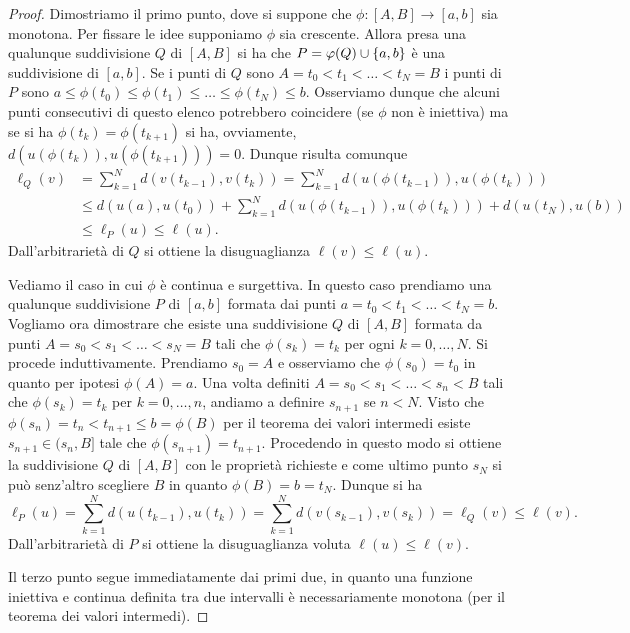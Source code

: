 \begin{proof}
Dimostriamo il primo punto, dove si suppone che $\phi:[A,B] \to [a,b]$ 
sia monotona. Per fissare le idee supponiamo $\phi$ sia crescente.
Allora presa una qualunque suddivisione $Q$ di $[A,B]$ si ha che 
$P=\varphi(Q)\cup {\left\{ a,b \right\}}$ è una suddivisione di $[a,b]$.
Se i punti di $Q$ sono $A = t_0 < t_1 < \dots < t_N = B$ i punti di 
$P$ sono $a \le \phi(t_0) \le \phi(t_1) \le \dots \le \phi(t_N) \le b$.
Osserviamo dunque che alcuni punti consecutivi di questo elenco 
potrebbero coincidere
(se $\phi$ non è iniettiva) ma se si ha $\phi(t_k) = \phi(t_{k+1})$
si ha, ovviamente, $d(u(\phi(t_k)), u(\phi(t_{k+1}))) = 0$. 
Dunque risulta comunque 
\begin{align*}
 \ell_Q(v) &= \sum_{k=1}^N d(v(t_{k-1}), v(t_k))
  = \sum_{k=1}^N d(u(\phi(t_{k-1})), u(\phi(t_k)))\\
  &\le d(u(a), u(t_0)) + \sum_{k=1}^N d(u(\phi(t_{k-1})), u(\phi(t_k))) + d(u(t_N), u(b))\\
  &\le \ell_P(u) \le \ell(u).
\end{align*}
Dall'arbitrarietà di $Q$ si ottiene la disuguaglianza $\ell(v) \le \ell(u)$.

Vediamo il caso in cui $\phi$ è continua e surgettiva. 
In questo caso prendiamo una qualunque suddivisione $P$ di $[a,b]$ 
formata dai punti $a = t_0 < t_1 < \dots < t_N = b$.
Vogliamo ora dimostrare che esiste una suddivisione $Q$ di $[A,B]$
formata da punti $A = s_0 < s_1 < \dots < s_N = B$ tali 
che $\phi(s_k) = t_k$ per ogni $k=0,\dots,N$. 
Si procede induttivamente. Prendiamo $s_0=A$ e osserviamo che $\phi(s_0) = t_0$
in quanto per ipotesi $\phi(A) = a$.
Una volta definiti $A = s_0 < s_1 < \dots < s_n < B$ tali che $\phi(s_k) = t_k$ per $k=0,\dots,n$,
andiamo a definire $s_{n+1}$ se $n < N$.
Visto che $\phi(s_n) = t_n < t_{n+1} \le b = \phi(B)$ 
per il teorema dei valori intermedi esiste $s_{n+1} \in (s_n, B]$ tale che
$\phi(s_{n+1}) = t_{n+1}$. 
Procedendo in questo modo si ottiene la suddivisione $Q$ di $[A,B]$ 
con le proprietà richieste e come ultimo punto $s_N$ si può senz'altro scegliere $B$ 
in quanto $\phi(B) = b = t_N$.
Dunque si ha 
\[
  \ell_P(u) = \sum_{k=1}^N d(u(t_{k-1}), u(t_k))
  = \sum_{k=1}^N d(v(s_{k-1}), v(s_k)) = \ell_Q(v) \le \ell(v).
\]
Dall'arbitrarietà di $P$ si ottiene la disuguaglianza voluta $\ell(u) \le \ell(v)$.

Il terzo punto segue immediatamente dai primi due, in quanto una funzione iniettiva e continua 
definita tra due intervalli è necessariamente monotona (per il teorema dei valori intermedi).
\end{proof}

